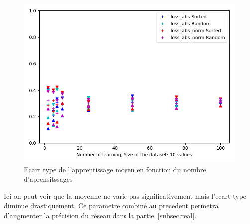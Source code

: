 \begin{figure}[H]
    \center
    \includegraphics[height=\moyen]{pict/appfn.png}
	\caption{Ecart type de l'apprentissage moyen en fonction du nombre d'aprensitssages}
	\label{fig:etfngraph1}
\end{figure}
\vspace{-5pt}
Ici on peut voir que la moyenne ne varie pas significativement mais l'ecart type diminue drastiquement.
Ce parametre combiné au precedent permetra d'augmenter la précision du réseau dans la partie\ \ref{subsec:real}.


